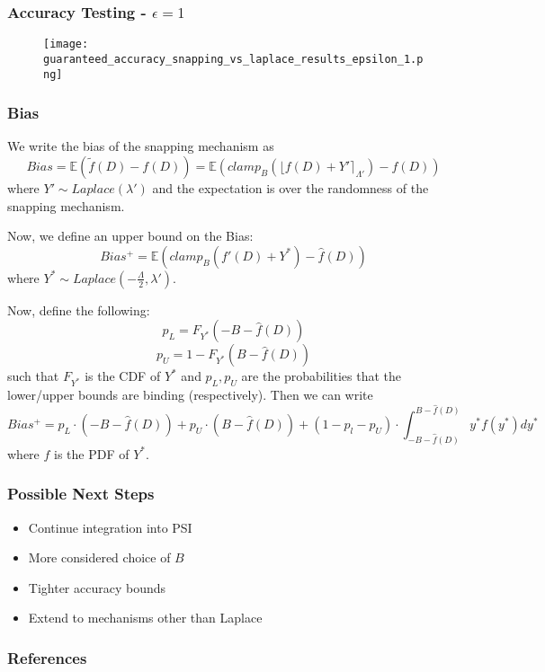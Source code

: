 \documentclass{beamer}
\begin{document}
\begin{frame}
    \frametitle{Accuracy Testing - $\epsilon = 1$}
    \begin{figure}
        \texttt{[image: guaranteed\_accuracy\_snapping\_vs\_laplace\_results\_epsilon\_1.png]}
    \end{figure}
\end{frame}

\begin{frame}[shrink=30]
    \frametitle{Bias}
    We write the bias of the snapping mechanism as
    \[ Bias = \mathbb{E}(\tilde{f}(D) - f(D)) = \mathbb{E}\left( clamp_B\left( \lfloor f(D) + Y' \rceil_{\Lambda'} \right) - f(D) \right) \]
    where $Y' \sim Laplace(\lambda')$ and the expectation is over the randomness of the snapping mechanism.

    Now, we define an upper bound on the Bias:
    \[ Bias^{+} = \mathbb{E}\left( clamp_B\left( f'(D) + Y^{*} \right) - \hat{f}(D) \right) \]
    where $Y^{*} \sim Laplace(-\frac{\Lambda}{2}, \lambda')$.

    Now, define the following:
    \[ p_L = F_{Y^*}(-B - \hat{f}(D)) \]
    \[ p_U = 1 - F_{Y^*}(B - \hat{f}(D)) \]
    such that $F_{Y^*}$ is the CDF of $Y^*$ and $p_L, p_U$ are the probabilities that the lower/upper bounds are binding (respectively).
    Then we can write
    \[ Bias^+ = p_L \cdot (-B - \hat{f}(D)) + p_U \cdot (B - \hat{f}(D)) + (1-p_l-p_U) \cdot \int_{-B-\hat{f}(D)}^{B-\hat{f}(D)}y^* f(y^*) dy^* \]
    where $f$ is the PDF of $Y^*$.
\end{frame}

\begin{frame}
    \frametitle{Possible Next Steps}
    \begin{itemize}
        \item Continue integration into PSI
        \item More considered choice of $B$
        \item Tighter accuracy bounds
        \item Extend to mechanisms other than Laplace
    \end{itemize}
\end{frame}

\begin{frame}[allowframebreaks]
    \frametitle{References}
    
    
\end{frame}
\end{document}
